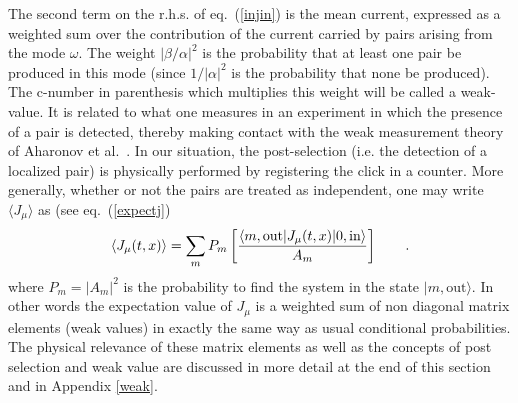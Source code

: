 \documentclass[12pt,oneside]{report}
\def\ket#1{|#1\rangle}
\def\elematrice#1#2#3{\langle #1|#2|#3 \rangle}
\begin{document}
\par The second term on the r.h.s. of eq.~(\ref{injin}) is 
the mean current, expressed as a weighted sum over
the contribution of the current carried by pairs arising from the mode
$\omega$. The
weight $|\beta /\alpha|^2$ is the probability that at least one pair be
produced
in this mode (since $1/|\alpha|^2$ is the probability that none be
produced). 
The c-number in parenthesis which multiplies this weight 
will be called a weak-value. It is related to what one
measures in an
experiment in which the presence of a pair is detected, thereby
making
contact with the weak measurement theory of Aharonov 
et al.~\cite{Ahar}. 
In our situation, the post-selection (i.e. the detection of a localized pair)
is physically performed by registering the click
in a counter.
More generally, whether or not the pairs 
are treated as independent,
one may write $\langle J_{\mu} \rangle$ as 
(see eq.~(\ref{expectj})
\begin{equation}
\langle J_{\mu}(t,x)\rangle =\sum_{m}P_{m} \left[{
 \elematrice{m,\mbox{out}}{J_{\mu}(t,x)}{0,\mbox{in}}
\over A_{m}} \right]
\qquad . \label{pexpectj}
\end{equation}
where $P_{m}=|A_{m}|^2$ is the probability 
to find the system in the state $\ket{m,\mbox{out}}$.
In other words the
expectation
value of $J_{\mu}$ is a weighted sum of non diagonal matrix
elements (weak values) in exactly the same way as usual conditional
probabilities. The physical relevance of these matrix elements as well as the
concepts of post selection and weak value are discussed in more detail at
the end of this section and in Appendix \ref{weak}.
\end{document}
